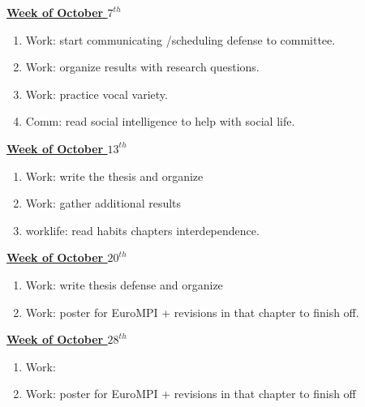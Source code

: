 \underline{\textbf{Week of October $7^{th}$}} \\
\begin{enumerate} 
\item Work: start communicating /scheduling defense to committee. 
\item Work: organize results with research questions. 
\item Work: practice vocal variety. 
\item Comm: read social intelligence to help with social life. 
\end{enumerate}

\underline{\textbf{Week of October $13^{th}$}} \\
\begin{enumerate}
\item Work: write the thesis and organize  
\item Work: gather additional results 
\item worklife: read habits chapters interdependence. 
\end{enumerate}

\underline{\textbf{Week of October $20^{th}$}} \\
\begin{enumerate}
\item Work: write thesis defense and organize
\item Work: poster for EuroMPI + revisions in that chapter to finish off. 
\end{enumerate}

\underline{\textbf{Week of October $28^{th}$}} \\
\begin{enumerate}
\item Work: 
 \item Work: poster for EuroMPI + revisions in that chapter  to finish off
\end{enumerate}
